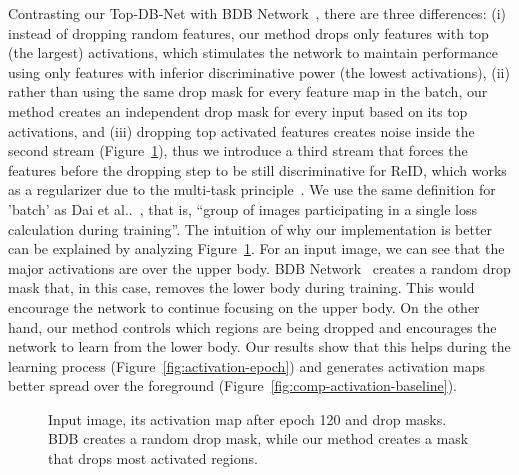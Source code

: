 \documentclass[a4paper,conference]{IEEEtran}
\makeatletter
\DeclareRobustCommand\onedot{\futurelet\@let@token\@onedot}
\def\@onedot{\ifx\@let@token.\else.\null\fi\xspace}
\def\etal{et al\onedot}
\makeatother
\begin{document}
Contrasting our Top-DB-Net with BDB Network~\cite{dai2019batch}, there are three differences: (i) instead of dropping random features, our method drops only features with top (the largest) activations, which stimulates the network to maintain performance using only features with inferior discriminative power (the lowest activations), (ii) rather than using the same drop mask for every feature map in the batch, our method creates an independent drop mask for every input based on its top activations, and (iii) dropping top activated features creates noise inside the second stream (Figure~\ref{fig:dropmask-comparison}), thus we introduce a third stream that forces the features before the dropping step to be still discriminative for ReID, which works as a regularizer due to the multi-task principle~\cite{goodfellow2016deep}. We use the same definition for 'batch' as Dai \etal~\cite{dai2019batch}, that is, ``group of images participating in a single loss calculation during training''. The intuition of why our implementation is better can be explained by analyzing Figure~\ref{fig:dropmask-comparison}. For an input image, we can see that the major activations are over the upper body. BDB Network~\cite{dai2019batch} creates a random drop mask that, in this case, removes the lower body during training. This would encourage the network to continue focusing on the upper body. On the other hand, our method controls which regions are being dropped and encourages the network to learn from the lower body. Our results show that this helps during the learning process (Figure~\ref{fig:activation-epoch}) and generates activation maps better spread over the foreground (Figure~\ref{fig:comp-activation-baseline}).
 
\begin{figure}[!htb]
  \captionsetup[subfigure]{labelformat=empty}
  \centering
   \hspace*{0.2cm}
   \hspace*{0.2cm}
   \hspace*{0.2cm}
  \caption{Input image, its activation map after epoch 120 and drop masks. BDB creates a random drop mask, while our method creates a mask that drops most activated regions.}
  \label{fig:dropmask-comparison}
\end{figure}
 
\end{document}

